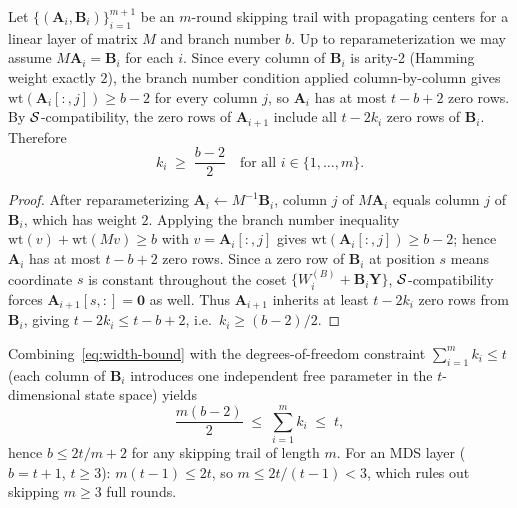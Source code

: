 \documentclass[11pt]{article}
\begin{document}
\begin{lemma}\label{lem:branch}
    Let $\{(\mathbf{A}_i,\mathbf{B}_i)\}_{i=1}^{m+1}$ be an $m$-round skipping trail
    with propagating centers for a linear layer of matrix $M$ and branch number $b$.
    Up to reparameterization we may assume $M\mathbf{A}_i = \mathbf{B}_i$ for each $i$.
    Since every column of $\mathbf{B}_i$ is arity-2 (Hamming weight exactly $2$), the
    branch number condition applied column-by-column gives $\mathrm{wt}(\mathbf{A}_i[:,j])\geq b-2$
    for every column $j$, so $\mathbf{A}_i$ has at most $t-b+2$ zero rows.
    By $\mathcal{S}$-compatibility, the zero rows of $\mathbf{A}_{i+1}$ include all $t-2k_i$
    zero rows of $\mathbf{B}_i$.  Therefore
    \begin{equation}\label{eq:width-bound}
        k_i \;\geq\; \frac{b-2}{2} \quad\text{for all }i\in\{1,\ldots,m\}.
    \end{equation}
\end{lemma}
\begin{proof}
    After reparameterizing $\mathbf{A}_i \leftarrow M^{-1}\mathbf{B}_i$, column $j$
    of $M\mathbf{A}_i$ equals column $j$ of $\mathbf{B}_i$, which has weight $2$.
    Applying the branch number inequality $\mathrm{wt}(v)+\mathrm{wt}(Mv)\geq b$
    with $v = \mathbf{A}_i[:,j]$ gives $\mathrm{wt}(\mathbf{A}_i[:,j])\geq b-2$;
    hence $\mathbf{A}_i$ has at most $t-b+2$ zero rows.
    Since a zero row of $\mathbf{B}_i$ at position $s$ means coordinate $s$ is
    constant throughout the coset $\{W_i^{(B)}+\mathbf{B}_i\mathbf{Y}\}$,
    $\mathcal{S}$-compatibility forces $\mathbf{A}_{i+1}[s,:]=\mathbf{0}$ as well.
    Thus $\mathbf{A}_{i+1}$ inherits at least $t-2k_i$ zero rows from $\mathbf{B}_i$,
    giving $t-2k_i \leq t-b+2$, i.e.\ $k_i\geq(b-2)/2$.
\end{proof}

\begin{remark}
    Combining~\eqref{eq:width-bound} with the degrees-of-freedom constraint
    $\sum_{i=1}^m k_i \leq t$ (each column of $\mathbf{B}_i$ introduces one
    independent free parameter in the $t$-dimensional state space) yields
    \[
        \frac{m(b-2)}{2} \;\leq\; \sum_{i=1}^m k_i \;\leq\; t,
    \]
    hence $b \leq 2t/m+2$ for any skipping trail of length $m$.
    For an MDS layer ($b=t+1$, $t\geq 3$): $m(t-1)\leq 2t$, so
    $m\leq 2t/(t-1) < 3$, which rules out skipping $m\geq 3$ full rounds.
\end{remark}
\end{document}
